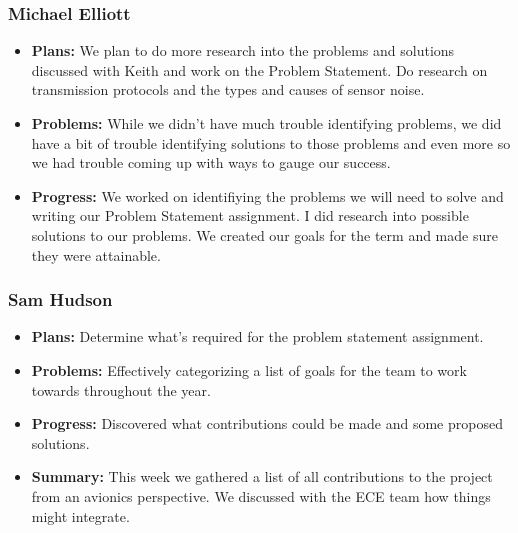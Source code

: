 \documentclass[onecolumn, draftclsnofoot,10pt, compsoc]{IEEEtran}
\begin{document}
\subsubsection{Michael Elliott}
\begin {itemize}
\item \textbf{Plans: }
  We plan to do more research into the problems and solutions discussed with Keith and work on the Problem Statement. Do research on transmission protocols and the types and causes of sensor noise.
\item \textbf{Problems: }
  While we didn't have much trouble identifying problems, we did have a bit of trouble identifying solutions to those problems and even more so we had trouble coming up with ways to gauge our success.
\item \textbf{Progress: }
  We worked on identifiying the problems we will need to solve and writing our Problem Statement assignment. I did research into possible solutions to our problems. We created our goals for the term and made sure they were attainable.
\end {itemize}
\subsubsection{Sam Hudson}
\begin {itemize}
\item \textbf{Plans: }Determine what’s required for the problem statement assignment.
\item \textbf{Problems: }Effectively categorizing a list of goals for the team to work towards throughout the year.
\item \textbf{Progress: }Discovered what contributions could be made and some proposed solutions.
\item \textbf{Summary: }This week we gathered a list of all contributions to the project from an avionics perspective. We discussed with the ECE team how things might integrate.
\end {itemize}
\end{document}

